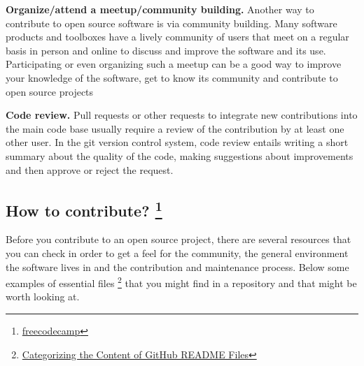 \documentclass[
  letterpaper,
  DIV=11,
  numbers=noendperiod]{scrreport}
\begin{document}
\textbf{Organize/attend a meetup/community building.} Another way to
contribute to open source software is via community building. Many
software products and toolboxes have a lively community of users that
meet on a regular basis in person and online to discuss and improve the
software and its use. Participating or even organizing such a meetup can
be a good way to improve your knowledge of the software, get to know its
community and contribute to open source projects

\textbf{Code review.} Pull requests or other requests to integrate new
contributions into the main code base usually require a review of the
contribution by at least one other user. In the git version control
system, code review entails writing a short summary about the quality of
the code, making suggestions about improvements and then approve or
reject the request.

\hypertarget{how-to-contribute-freecodecamp}{%
\subsection[How to contribute? ]{\texorpdfstring{How to contribute?
\footnote{\href{https://www.freecodecamp.org/news/how-to-contribute-to-open-source-projects-beginners-guide/}{freecodecamp}}}{How to contribute? }}\label{how-to-contribute-freecodecamp}}

Before you contribute to an open source project, there are several
resources that you can check in order to get a feel for the community,
the general environment the software lives in and the contribution and
maintenance process. Below some examples of essential files \footnote{\href{https://link.springer.com/article/10.1007/s10664-018-9660-3}{Categorizing
  the Content of GitHub README Files}} that you might find in a
repository and that might be worth looking at.
\end{document}
